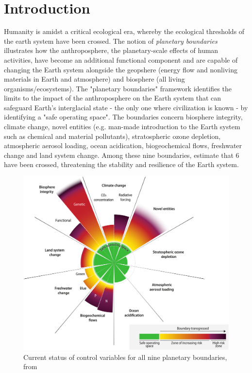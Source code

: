 \chapter*{Introduction}
\label{Introduction}
Humanity is amidst a critical ecological era, whereby the ecological thresholds of the earth system have been crossed. The notion of \textit{planetary boundaries} \citep{rockstrom2009safe,steffen_2015_planetary} illustrates how the anthroposphere, the planetary-scale effects of human activities, have become an additional functional component and are capable of changing the Earth system \citep{richardson_earth_2023} alongside the geopshere (energy flow and nonliving materials in Earth and atmosphere) and biosphere (all living organisms/ecosystems). The "planetary boundaries" framework identifies the limits to the impact of the anthroposphere on the Earth system that can safeguard Earth's interglacial state - the only one where civilization is known - by identifying a "safe operating space". The boundaries concern biosphere integrity, climate change, novel entities (e.g. man-made introduction to the Earth system such as chemical and material pollutants), stratospheric ozone depletion, atmospheric aerosol loading, ocean acidication, biogeochemical flows, freshwater change and land system change. Among these nine boundaries, \cite{richardson_earth_2023} estimate that 6 have been crossed, threatening the stability and resilience of the Earth system. 

\begin{figure}[H]
	\centering
	\includegraphics[width= .7\textwidth]{figures/intro/planetary_bounds.jpg}
	\caption{Current status of control variables for all nine planetary boundaries, from \cite{richardson_earth_2023}}
\end{figure}

